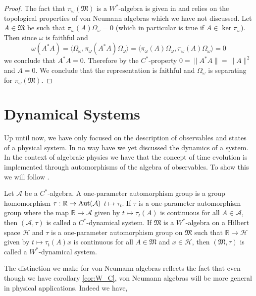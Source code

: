 \begin{proof}
The fact that $\pi_\omega(\mathfrak{M})$ is a $W^*$-algebra is given in \cite{Bratteli1997} and relies on the topological properties of von Neumann algebras which we have not discussed. Let $A\in\mathfrak{M}$ be such that $\pi_\omega(A)\Omega_\omega=0$ (which in particular is true if $A\in\ker\pi_\omega$). Then since $\omega$ is faithful and
\begin{equation}
\omega(A^*A)=\langle \Omega_\omega, \pi_\omega (A^*A)\Omega_\omega\rangle=\langle \pi_\omega(A)\Omega_\omega,\pi_\omega(A)\Omega_\omega\rangle=0
\end{equation}
we conclude that $A^*A=0$. Therefore by the $C^*$-property $0=\|A^*A\|=\|A\|^2$ and $A=0$. We conclude that the representation is faithful and $\Omega_\omega$ is separating for $\pi_\omega(\mathfrak{M})$.
\end{proof}

\section{Dynamical Systems}

Up until now, we have only focused on the description of observables and states of a physical system. In no way have we yet discussed the dynamics of a system. In the context of algebraic physics we have that the concept of time evolution is implemented through automorphisms of the algebra of observables. To show this we will follow \cite{Duvenhage1999}.

\begin{definition}\label{def:dynamics}
Let $\mathcal{A}$ be a $C^*$-algebra. A one-parameter automorphism group is a group homomorphism $\tau:\mathbb{R}\rightarrow \operatorname{Aut}(\mathcal{A})$ $t\mapsto\tau_t$. If $\tau$ is a one-parameter automorphism group where the map $\mathbb{R}\rightarrow\mathcal{A}$ given by $t\mapsto\tau_t(A)$ is continuous for all $A\in\mathcal{A}$, then $(\mathcal{A},\tau)$ is called a $C^*$-dynamical system. If $\mathfrak{M}$ is a $W^*$-algebra on a Hilbert space $\mathcal{H}$ and $\tau$ is a one-parameter automorphism group on $\mathfrak{M}$ such that $\mathbb{R}\rightarrow\mathcal{H}$ given by $t\mapsto\tau_t(A)x$ is continuous for all $A\in\mathfrak{M}$ and $x\in\mathcal{H}$, then $(\mathfrak{M},\tau)$ is called a $W^*$-dynamical system. 
\end{definition}

The distinction we make for von Neumann algebras reflects the fact that even though we have corollary \ref{cor:W_C}, von Neumann algebras will be more general in physical applications. Indeed we have,

